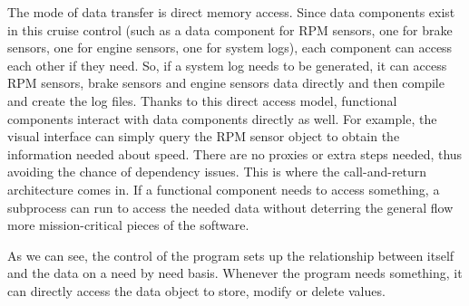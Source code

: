 \documentclass[preprint,11pt,3p]{article}
\begin{document}
The mode of data transfer is direct memory access. Since data components exist in this cruise control (such as a data component for RPM sensors, one for brake sensors, one for engine sensors, one for system logs), each component can access each other if they need. So, if a system log needs to be generated, it can access RPM sensors, brake sensors and engine sensors data directly and then compile and create the log files. Thanks to this direct access model, functional components interact with data components directly as well. For example, the visual interface can simply query the RPM sensor object to obtain the information needed about speed. There are no proxies or extra steps needed, thus avoiding the chance of dependency issues. This is where the call-and-return architecture comes in. If a functional component needs to access something, a subprocess can run to access the needed data without deterring the general flow more mission-critical pieces of the software. \par 
As we can see, the control of the program sets up the relationship between itself and the data on a need by need basis. Whenever the program needs something, it can directly access the data object to store, modify or delete values. 
\end{document}
